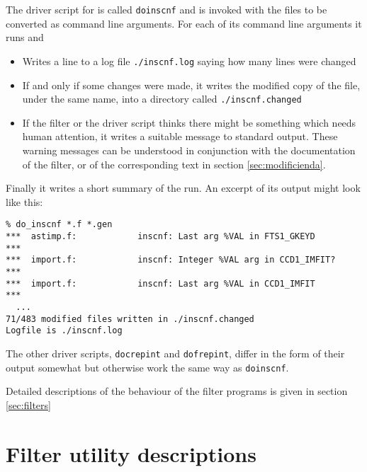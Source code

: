 \documentclass[twoside,11pt]{article}
\renewcommand{\_}{\texttt{\symbol{95}}}
\begin{document}
The driver script for  is called {\tt do\_inscnf}
and is invoked with the files to be converted as command line arguments.
For each of its command line arguments it runs  and
\begin{itemize}
\item Writes a line to a log file {\tt ./inscnf.log} 
      saying how many lines were changed
\item If and only if some changes were made, it writes the modified copy
      of the file, under the same name, 
      into a directory called {\tt ./inscnf.changed}
\item If the filter or the driver script thinks there might be something 
      which needs human attention, it writes a suitable message to standard
      output.  These warning messages can be understood in conjunction 
      with the documentation of the filter, or of the corresponding 
      text in section \ref{sec:modificienda}.
\end{itemize}
Finally it writes a short summary of the run.
An excerpt of its output might look like this:
\begin{squote}
\begin{verbatim}
% do_inscnf *.f *.gen
***  astimp.f:            inscnf: Last arg %VAL in FTS1_GKEYD       ***
***  import.f:            inscnf: Integer %VAL arg in CCD1_IMFIT?   ***
***  import.f:            inscnf: Last arg %VAL in CCD1_IMFIT       ***
  ...
71/483 modified files written in ./inscnf.changed
Logfile is ./inscnf.log
\end{verbatim}
\end{squote}

The other driver scripts, {\tt do\_crepint} and {\tt do\_frepint},
differ in the form of their output somewhat but otherwise work the
same way as {\tt do\_inscnf}.

Detailed descriptions of the behaviour of the filter programs is
given in section \ref{sec:filters}

\section{Filter utility descriptions\label{sec:filters}}




\end{document}
